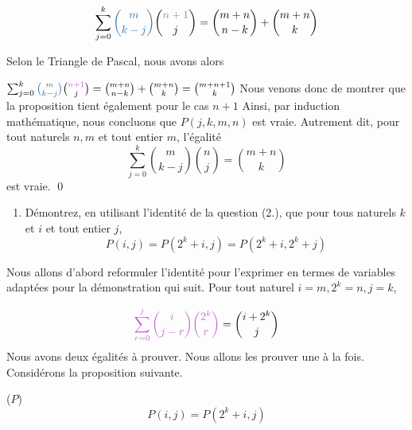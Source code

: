 \documentclass[16pt]{report}
\begin{document}
\begin{multicols*}{2}
\begin{Preuve*}{}{}
        \begin{align}
            \sum_{j=0}^{k} \textcolor{myb}{{m \choose k-j}} {\textcolor{myp}{n+1} \choose j} = {m + n \choose n - k} 
            + {m+n \choose k}
        \end{align}


        Selon le Triangle de Pascal, nous avons alors 

            $\sum_{j=0}^{k} \textcolor{myb}{{m \choose k-j}} {\textcolor{myp}{n+1} \choose j} = {m + n \choose n - k} 
            + {m+n \choose k} = {m+n+1 \choose k}$ Nous venons donc de montrer que la proposition tient 
            également pour le cas $n+1$ Ainsi, par induction mathématique, nous concluons que $P(j,k,m, n)$ est vraie. 
            Autrement dit, pour tout naturels $n, m$ et tout entier $m$, l'égalité 
                \[ \sum_{j=0}^{k} {m \choose k-j} {n \choose j} = {m+n \choose k} \]
            est vraie. \qed 
        \end{Preuve*}
        
        \begin{enumerate}
            \item Démontrez, en utilisant l’identité de la question (2.), que pour tous naturels $k$ et $i$ 
                et tout entier $j$, 
                \[ P(i, j) = P(2^k +i, j) = P(2^k +i, 2^k +j) \]
        \end{enumerate}
        Nous allons d'abord reformuler l'identité pour l'exprimer en termes de variables 
        adaptées pour la démonstration qui suit. Pour tout naturel $i = m, 2^k = n, j = k$, 
        
        \begin{align}
            \textcolor{myp}{\sum_{r=0}^{j} {i \choose j-r} {2^k \choose r}} = {i + 2^k   \choose j}
        \end{align}
        Nous avons deux égalités à prouver. Nous allons les prouver une à la fois. 
        Considérons la proposition suivante.  

    \begin{prop}{($P$)}{}
        \[ P(i, j) = P(2^k +i, j) \]
    \end{prop}
    

\end{multicols*}
\end{document}
